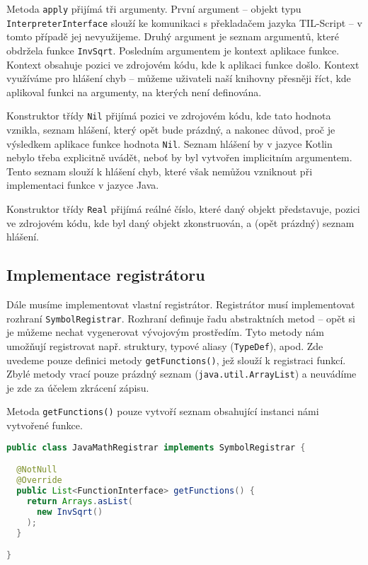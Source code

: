 Metoda \lstinline{apply} přijímá tři argumenty. První argument -- objekt typu
\lstinline{InterpreterInterface} slouží ke komunikaci s překladačem jazyka TIL-Script -- v tomto
případě jej nevyužijeme. Druhý argument je seznam argumentů, které obdržela funkce
\lstinline{InvSqrt}. Posledním argumentem je kontext aplikace funkce. Kontext obsahuje pozici
ve zdrojovém kódu, kde k aplikaci funkce došlo. Kontext využíváme pro hlášení chyb -- můžeme
uživateli naší knihovny přesněji říct, kde aplikoval funkci na argumenty, na kterých není
definována.

Konstruktor třídy \lstinline{Nil} přijímá pozici ve zdrojovém kódu, kde tato hodnota vznikla,
seznam hlášení, který opět bude prázdný, a nakonec důvod, proč je výsledkem aplikace funkce hodnota
\lstinline{Nil}. Seznam hlášení by v jazyce Kotlin nebylo třeba explicitně uvádět, neboť by byl
vytvořen implicitním argumentem. Tento seznam slouží k hlášení chyb, které však nemůžou vzniknout
při implementaci funkce v jazyce Java.

Konstruktor třídy \lstinline{Real} přijímá reálné číslo, které daný objekt představuje, pozici
ve zdrojovém kódu, kde byl daný objekt zkonstruován, a (opět prázdný) seznam hlášení.

\subsection{Implementace registrátoru}

Dále musíme implementovat vlastní registrátor. Registrátor musí implementovat rozhraní
\lstinline{SymbolRegistrar}. Rozhraní definuje řadu abstraktních metod -- opět si je můžeme nechat
vygenerovat vývojovým prostředím. Tyto metody nám umožňují registrovat např. struktury, typové
aliasy (\lstinline{TypeDef}), apod. Zde uvedeme pouze definici metody \lstinline{getFunctions()},
jež slouží k registraci funkcí. Zbylé metody vrací pouze prázdný seznam
(\lstinline{java.util.ArrayList}) a neuvádíme je zde za účelem zkrácení zápisu.

Metoda \lstinline{getFunctions()} pouze vytvoří seznam obsahující instanci námi vytvořené funkce.

\begin{lstlisting}[caption={Java registrátor}, language=Java]
public class JavaMathRegistrar implements SymbolRegistrar {

  @NotNull
  @Override
  public List<FunctionInterface> getFunctions() {
    return Arrays.asList(
      new InvSqrt()
    );
  }

}
\end{lstlisting}

